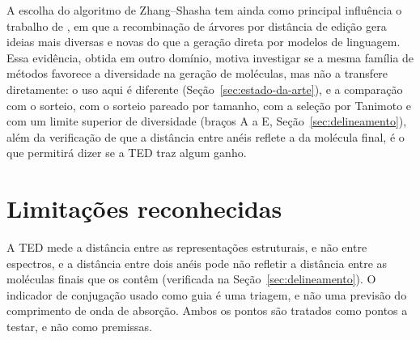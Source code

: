 A escolha do algoritmo de Zhang--Shasha tem ainda como principal influência o trabalho de , em que a recombinação de árvores por distância de edição gera ideias mais diversas e novas do que a geração direta por modelos de linguagem. Essa evidência, obtida em outro domínio, motiva investigar se a mesma família de métodos favorece a diversidade na geração de moléculas, mas não a transfere diretamente: o uso aqui é diferente (Seção~\ref{sec:estado-da-arte}), e a comparação com o sorteio, com o sorteio pareado por tamanho, com a seleção por Tanimoto e com um limite superior de diversidade (braços A a E, Seção~\ref{sec:delineamento}), além da verificação de que a distância entre anéis reflete a da molécula final, é o que permitirá dizer se a TED traz algum ganho.

\section{Limitações reconhecidas}

A TED mede a distância entre as representações estruturais, e não entre espectros, e a distância entre dois anéis pode não refletir a distância entre as moléculas finais que os contêm (verificada na Seção~\ref{sec:delineamento}). O indicador de conjugação usado como guia é uma triagem, e não uma previsão do comprimento de onda de absorção. Ambos os pontos são tratados como pontos a testar, e não como premissas.
